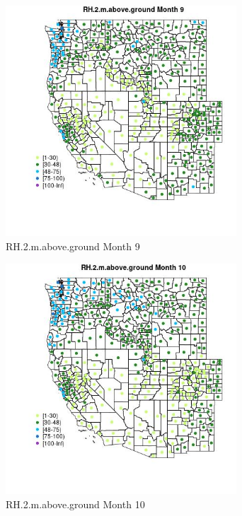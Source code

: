 \begin{figure} 
\centering  
\includegraphics[width=0.77\textwidth]{Code_Outputs/df_report_ML_predictors_CountyCentroid_Locations_Dates_2008-01-01to2018-12-31_MapObsMo9RH2maboveground.jpg} 
\caption{\label{fig:df_report_ML_predictors_CountyCentroid_Locations_Dates_2008-01-01to2018-12-31MapObsMo9RH2maboveground}RH.2.m.above.ground Month 9} 
\end{figure} 
 

\begin{figure} 
\centering  
\includegraphics[width=0.77\textwidth]{Code_Outputs/df_report_ML_predictors_CountyCentroid_Locations_Dates_2008-01-01to2018-12-31_MapObsMo10RH2maboveground.jpg} 
\caption{\label{fig:df_report_ML_predictors_CountyCentroid_Locations_Dates_2008-01-01to2018-12-31MapObsMo10RH2maboveground}RH.2.m.above.ground Month 10} 
\end{figure} 
 


